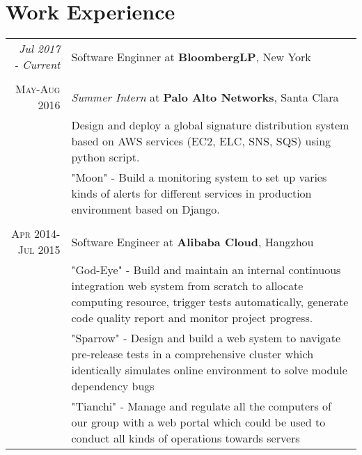 \documentclass[a4paper,10pt]{article}
\begin{document}
\section{Work Experience}
\begin{tabular}{r|p{11cm}}
  \emph{Jul 2017 - Current} & Software Enginner at \textbf{BloombergLP}, New York\\
  \multicolumn{2}{c}{} \\
  \textsc{May-Aug 2016}&\emph{Summer Intern} at \textbf{Palo Alto Networks}, Santa Clara\\
  &\footnotesize{Design and deploy a global signature distribution system based on AWS services (EC2, ELC, SNS, SQS) using python script.}\\
  &\footnotesize{"Moon" - Build a monitoring system to set up varies kinds of alerts for different services in production environment based on Django.}\\
  \multicolumn{2}{c}{}\\
  \textsc{Apr 2014-Jul 2015} & Software Engineer at \textbf{Alibaba Cloud}, Hangzhou \\
  &\footnotesize{"God-Eye" - Build and maintain an internal continuous integration web system from scratch to allocate computing resource, trigger tests automatically, generate code quality report and monitor project progress.}\\
  &\footnotesize{"Sparrow" - Design and build a web system to navigate pre-release tests in a comprehensive cluster which identically simulates online environment to solve module dependency bugs}\\
  &\footnotesize{"Tianchi" - Manage and regulate all the computers of our group with a web portal which could be used to conduct all kinds of operations towards servers
}\\
\end{tabular}

\end{document}
